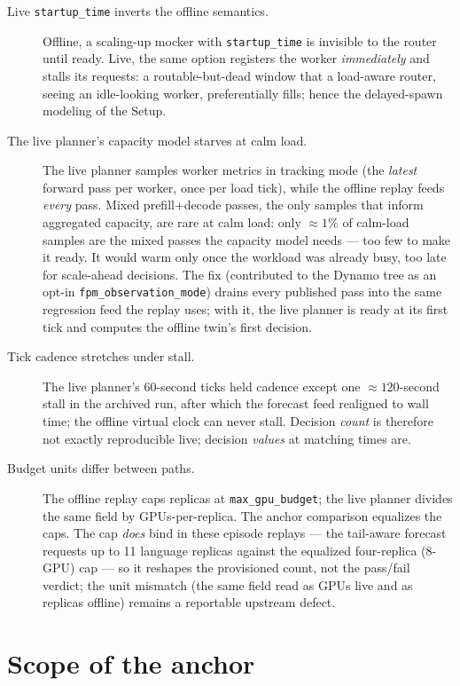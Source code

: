 \begin{description}
\item[Live \texttt{startup\_time} inverts the offline semantics.]
Offline, a scaling-up mocker with \texttt{startup\_time} is invisible
to the router until ready. Live, the same option registers the worker
\emph{immediately} and stalls its requests: a routable-but-dead window
that a load-aware router, seeing an idle-looking worker,
preferentially fills; hence the delayed-spawn modeling of the Setup.
\item[The live planner's capacity model starves at calm load.] The live
planner samples worker metrics in tracking mode (the \emph{latest}
forward pass per worker, once per load tick), while the offline
replay feeds \emph{every} pass. Mixed prefill+decode passes, the only
samples that inform aggregated capacity, are rare at calm load: only
${\approx}1\%$ of calm-load samples are the mixed passes the capacity
model needs --- too few to make it ready. It would warm only once the workload was already busy,
too late for scale-ahead decisions. The fix (contributed to the Dynamo
tree as an opt-in \texttt{fpm\_observation\_mode}) drains every
published pass into the same regression feed the replay uses;
with it, the live planner is ready at its first tick and computes the
offline twin's first decision.
\item[Tick cadence stretches under stall.] The live planner's 60-second
ticks held cadence except one ${\approx}120$-second stall in the archived
run, after which the forecast feed realigned to wall time; the offline virtual clock can
never stall. Decision \emph{count} is therefore not exactly
reproducible live; decision \emph{values} at matching times are.
\item[Budget units differ between paths.] The offline replay caps
replicas at \texttt{max\_gpu\_budget}; the live planner divides the
same field by GPUs-per-replica. The anchor comparison equalizes the
caps. The cap \emph{does} bind in these episode replays --- the
tail-aware forecast requests up to 11 language replicas against the
equalized four-replica (8-GPU) cap --- so it reshapes the provisioned
count, not the pass/fail verdict; the unit mismatch (the same field read
as GPUs live and as replicas offline) remains a reportable upstream
defect.
\end{description}

\section{Scope of the anchor}
\label{sec:val-scope}

